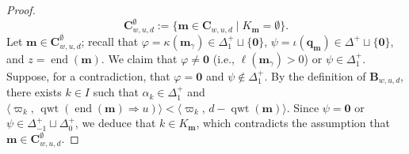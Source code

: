 \documentclass[11pt,a4paper,reqno,dvipdfmx]{amsart}
\numberwithin{equation}{section}
\newcommand{\vp}{\varphi}
\newcommand{\vpi}{\varpi}
\newcommand{\bm}{\mathbf{m}}
\newcommand{\bq}{\mathbf{q}}
\newcommand{\bB}{\mathbf{B}}
\newcommand{\bC}{\mathbf{C}}
\newcommand{\bzero}{\mathbf{0}}
\DeclareMathOperator{\qwt}{qwt}
\DeclareMathOperator{\ed}{end}
\newcommand{\pair}[2]{\langle #1,\,#2 \rangle}
\theoremstyle{plain}
\theoremstyle{definition}
\theoremstyle{remark}
\begin{document}
\begin{proof}
%
\begin{equation}
\bC_{w,u,d}^{\emptyset}:=
\bigl\{ \bm \in \bC_{w,u,d} \mid K_{\bm} = \emptyset \bigr\}. 
\end{equation}
%
Let $\bm \in \bC_{w,u,d}^{\emptyset}$; recall that 
$\vp=\kappa(\bm_{\gamma}) \in \Delta_{1}^{+} \sqcup \{\bzero\}$, 
$\psi=\iota(\bq_{\bm}) \in \Delta^{+} \sqcup \{\bzero\}$, and $z=\ed(\bm)$. 
We claim that $\vp \ne \bzero$ (i.e., $\ell(\bm_{\gamma}) > 0$) or 
$\psi \in \Delta_{1}^{+}$. Suppose, for a contradiction, that 
$\vp = \bzero$ and $\psi \notin \Delta_{1}^{+}$. By the definition of 
$\bB_{w,u,d}$, there exists $k \in I$ such that 
$\alpha_{k} \in \Delta_{1}^{+}$ and 
$\pair{\vpi_{k}}{\qwt(\ed(\bm) \Rightarrow u)} < 
\pair{\vpi_{k}}{d - \qwt(\bm)}$. Since $\psi = \bzero$ or 
$\psi \in \Delta_{-1}^{+} \sqcup \Delta_{0}^{+}$, we deduce that 
$k \in K_{\bm}$, which contradicts the assumption that $\bm \in \bC_{w,u,d}^{\emptyset}$. 

\medskip


\end{proof}
\end{document}
